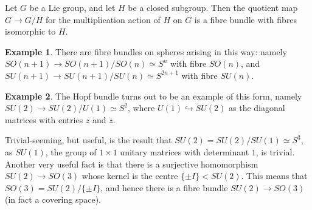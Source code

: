 \documentclass{tufte-handout}
\def\into {\hookrightarrow}
\theoremstyle{definition}
\newtheorem{example}{Example}
\begin{document}
Let $G$ be a Lie group, and let $H$ be a closed subgroup. Then the quotient map $G\to G/H$ for the multiplication action of $H$ on $G$ is a fibre bundle with fibres isomorphic to $H$.

\begin{example}
There are fibre bundles on spheres arising in this way: namely $SO(n+1) \to SO(n+1)/SO(n) \simeq S^n$ with fibre $SO(n)$, and $SU(n+1) \to SU(n+1)/SU(n) \simeq S^{2n+1}$ with fibre $SU(n)$.
\end{example}

\begin{example}
The Hopf bundle turns out to be an example of this form, namely $SU(2) \to SU(2)/U(1) \simeq S^2$, where $U(1) \into SU(2)$ as the diagonal matrices with entries $z$ and $\overline{z}$.
\end{example}

Trivial-seeming, but useful, is the result that $SU(2) = SU(2)/SU(1) \simeq S^3$, as $SU(1)$, the group of $1\times 1$ unitary matrices with determinant $1$, is trivial. Another very useful fact is that there is a surjective homomorphism $SU(2) \to SO(3)$ whose kernel is the centre $\{\pm I\} < SU(2)$. This means that $SO(3) = SU(2)/\{\pm I\}$, and hence there is a fibre bundle $SU(2) \to SO(3)$ (in fact a covering space).
\end{document}
